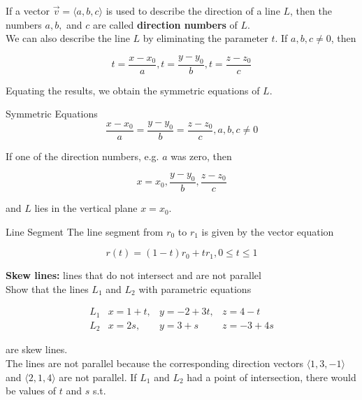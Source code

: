         If a vector $\vec{v} = \langle a, b, c\rangle$ is used to describe the direction of a line $L$, then the numbers $a,b,$ and $c$ are called \textbf{direction numbers} of $L$. \\

        We can also describe the line $L$ by eliminating the parameter $t$. If $a,b,c\not = 0$, then

        \[
            t = \frac{x-x_0}{a}, t = \frac{y-y_0}{b}, t = \frac{z-z_0}{c}
        \]

        Equating the results, we obtain the symmetric equations of $L$.

        \begin{axiom}{Symmetric Equations}
            \[
                \frac{x-x_0}{a} = \frac{y-y_0}{b} = \frac{z-z_0}{c}, a,b,c\not = 0
            \]

            If one of the direction numbers, e.g. $a$ was zero, then

            \[
                x = x_0, \frac{y-y_0}{b}, \frac{z-z_0}{c}
            \]

            and $L$ lies in the vertical plane $x=x_0$.
        \end{axiom}

        \begin{axiom}{Line Segment}
            The line segment from $r_0$ to $r_1$ is given by the vector equation

            \[
                r(t) = (1-t) r_0 + tr_1, 0 \leq t \leq 1
            \]
        \end{axiom}

        \textbf{Skew lines:} lines that do not intersect and are not parallel \\

        \textit{} Show that the lines $L_1$ and $L_2$ with parametric equations

        \begin{align*}
            L_1 & x = 1 + t, & y = -2+3t, & z = 4-t \\
            L_2 & x = 2s,    & y = 3 + s  & z = -3 + 4s
        \end{align*}

        are skew lines. \\

        The lines are not parallel because the corresponding direction vectors $\langle 1, 3, -1\rangle$ and $\langle 2, 1, 4\rangle$ are not parallel. If $L_1$ and $L_2$ had a point of intersection, there would be
        values of $t$ and $s$ s.t.

